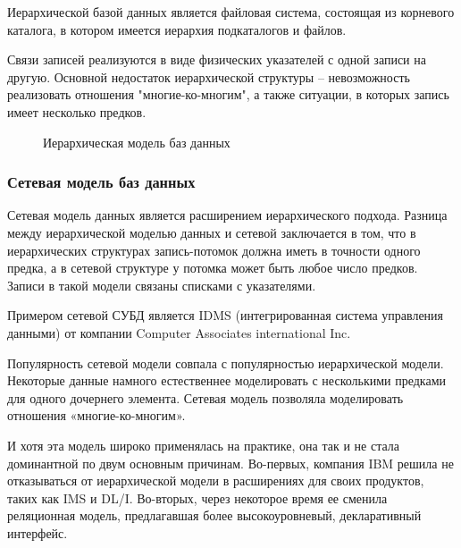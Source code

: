 \documentclass[a4paper, 14pt]{article}
\begin{document}
	Иерархической базой данных является файловая система, состоящая из корневого каталога, в котором имеется иерархия подкаталогов и файлов.
	
	Связи записей реализуются в виде физических указателей с одной записи на другую. Основной недостаток иерархической структуры – невозможность реализовать отношения "многие-ко-многим", а также ситуации, в которых запись имеет несколько предков. \cite{0}
	
	\begin{figure}[h]
		\caption{Иерархическая модель баз данных}
		\label{fig:image}
	\end{figure}
	
	\subsubsection{Сетевая модель баз данных}
	
	Сетевая модель данных является расширением иерархического подхода. 
	Разница между иерархической моделью данных и сетевой заключается в том, что в иерархических структурах запись-потомок должна иметь в точности одного предка, а в сетевой структуре у потомка может быть любое число предков. 
	Записи в такой модели связаны списками с указателями.
	
	Примером сетевой СУБД является IDMS (интегрированная система управления данными) от компании Computer Associates international Inc.
	
	Популярность сетевой модели совпала с популярностью иерархической модели. 
	Некоторые данные намного естественнее моделировать с несколькими предками для одного дочернего элемента. 
	Сетевая модель позволяла моделировать отношения «многие-ко-многим».
	
	И хотя эта модель широко применялась на практике, она так и не стала доминантной по двум основным причинам. 
	Во-первых, компания IBM решила не отказываться от иерархической модели в расширениях для своих продуктов, таких как IMS и DL/I. 
	Во-вторых, через некоторое время ее сменила реляционная модель, предлагавшая более высокоуровневый, декларативный интерфейс. \cite{0}
	
\end{document}
